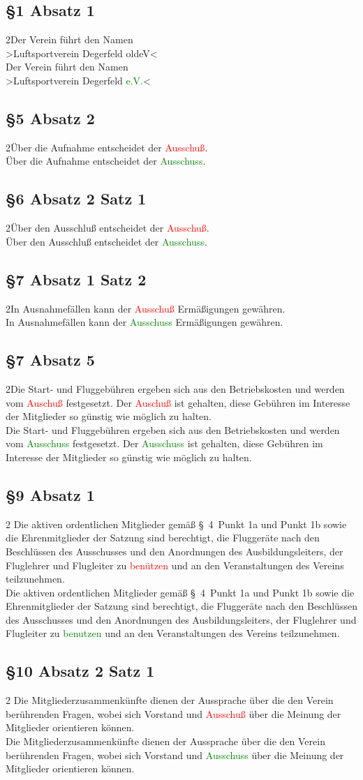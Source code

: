 \documentclass[10pt,a4paper,parskip=half]{scrartcl}
\newcommand{\new}[1]{\textcolor{Green}{#1}}
\newcommand{\old}[1]{\textcolor{Red}{#1}}
\newcommand{\compare}[3]{\subsection*{#1}\begin{multicols}{2}#2\columnbreak\\#3\end{multicols}}
\begin{document}
  \compare{§1 Absatz 1}
  {Der Verein führt den Namen\\>Luftsportverein Degerfeld old{eV}<}
  {Der Verein führt den Namen\\>Luftsportverein Degerfeld \new{e.V.}<}

  \compare{§5 Absatz 2}{Über die Aufnahme entscheidet der \old{Ausschuß}.}{Über die Aufnahme entscheidet der \new{Ausschuss}.}

  \compare{§6 Absatz 2 Satz 1}
  {Über den Ausschluß entscheidet der \old{Ausschuß}.}
  {Über den Ausschluß entscheidet der \new{Ausschuss}.}

  \compare{§7 Absatz 1 Satz 2}
  {In Ausnahmefällen kann der \old{Ausschuß} Ermäßigungen gewähren.}
  {In Ausnahmefällen kann der \new{Ausschuss} Ermäßigungen gewähren.}

  \compare{§7 Absatz 5}
  {Die Start- und Fluggebühren ergeben sich aus den Betriebskosten und werden vom \old{Auschuß} festgesetzt.
  Der \old{Auschuß} ist gehalten,
  diese Gebühren im Interesse der Mitglieder so günstig wie möglich zu halten.}
  {Die Start- und Fluggebühren ergeben sich aus den Betriebskosten und werden vom \new{Ausschuss} festgesetzt.
  Der \new{Ausschuss} ist gehalten,
  diese Gebühren im Interesse der Mitglieder so günstig wie möglich zu halten.}

  \compare{§9 Absatz 1}{
    Die aktiven ordentlichen Mitglieder gemäß §~4~Punkt 1a und Punkt 1b
    sowie die Ehrenmitglieder der Satzung sind berechtigt,
    die Fluggeräte nach den Beschlüssen des Ausschusses und den Anordnungen des Ausbildungsleiters,
    der Fluglehrer und Flugleiter zu \old{benützen} und an den Veranstaltungen des Vereins teilzunehmen.
  }{
    Die aktiven ordentlichen Mitglieder gemäß §~4~Punkt 1a und Punkt 1b
    sowie die Ehrenmitglieder der Satzung sind berechtigt,
    die Fluggeräte nach den Beschlüssen des Ausschusses und den Anordnungen des Ausbildungsleiters,
    der Fluglehrer und Flugleiter zu \new{benutzen} und an den Veranstaltungen des Vereins teilzunehmen.
  }

  \compare{§10 Absatz 2 Satz 1}{
    Die Mitgliederzusammenkünfte dienen der Aussprache über die den Verein berührenden Fragen,
    wobei sich Vorstand und \old{Ausschuß} über die Meinung der Mitglieder orientieren können.
  }{
    Die Mitgliederzusammenkünfte dienen der Aussprache über die den Verein berührenden Fragen,
    wobei sich Vorstand und \new{Ausschuss} über die Meinung der Mitglieder orientieren können.
  }
\end{document}
